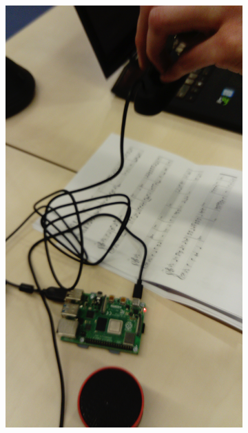 \documentclass[12pt]{article}
\begin{document}
\begin{figure}[h!]
	\centering
	\begin{subfigure}[b]{0.45\linewidth}
		\includegraphics[width=1.7\linewidth,angle=270,origin=c]{DSC_0071.JPG}
	\end{subfigure}
	\begin{subfigure}[b]{0.45\linewidth}

\end{subfigure}
\end{figure}
\end{document}
